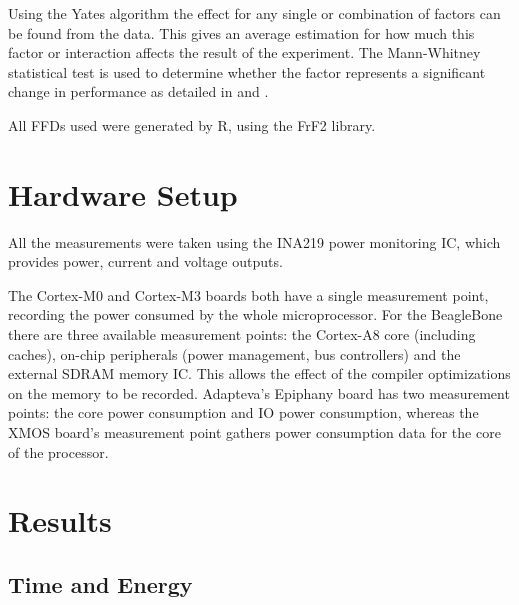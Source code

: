 \documentclass[twocolumn]{article}
\begin{document}
Using the Yates algorithm\cite{BoxHunter} the effect for any single or combination of factors can be found from the data. This gives an average estimation for how much this factor or interaction affects the result of the experiment. The Mann-Whitney statistical test is used to determine whether the factor represents a significant change in performance as detailed in \cite{EnergyReductionCompilerOptions} and \cite{Haneda2005}.

All FFDs used were generated by R\cite{R}, using the FrF2 library\cite{FrF2}.

\section{Hardware Setup}

All the measurements were taken using the INA219 power monitoring IC\cite{INA219}, which provides power, current and voltage outputs.

The Cortex-M0 and Cortex-M3 boards both have a single measurement point, recording the power consumed by the whole microprocessor. For the BeagleBone there are three available measurement points: the Cortex-A8 core (including caches), on-chip peripherals (power management, bus controllers) and the external SDRAM memory IC. This allows the effect of the compiler optimizations on the memory to be recorded. Adapteva's Epiphany board has two measurement points: the core power consumption and IO power consumption, whereas the XMOS board's measurement point gathers power consumption data for the core of the processor.

\section{Results}

\subsection*{Time and Energy}
\end{document}
